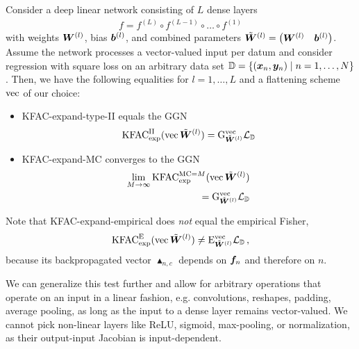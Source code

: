 \begin{test}
  Consider a deep linear network consisting of $L$ dense layers
  \begin{align*}
    f = f^{(L)} \circ f^{(L-1)} \circ \ldots \circ f^{(1)}
  \end{align*}
  with weights $\mW^{(l)}$, bias $\vb^{(l)}$, and combined parameters $\tilde{\mW}^{(l)} = \begin{pmatrix} \mW^{(l)} & \vb^{(l)} \end{pmatrix}$.
  Assume the network processes a vector-valued input per datum and consider regression with square loss on an arbitrary data set $\sD = \{ (\vx_n, \vy_n) \mid n = 1, \dots, N \}$.
  Then, we have the following equalities for $l = 1, \dots, L$ and a flattening scheme $\vec$ of our choice:
  \begin{itemize}
  \item KFAC-expand-type-II equals the GGN
    \begin{align*}
      \kfac^{\text{II}}_{\text{exp}}(\vec \tilde{\mW}^{(l)})
      =
      \ggn^{\vec}_{\tilde{\mW}^{(l)}} \gL_{\sD}
    \end{align*}
  \item KFAC-expand-MC converges to the GGN
    \begin{align*}
      \lim_{M \to \infty} \kfac^{\text{MC}=M}_{\text{exp}}(\vec \tilde{\mW}^{(l)})
      \\=
      \ggn^{\vec}_{\tilde{\mW}^{(l)}} \gL_{\sD}
    \end{align*}

  \end{itemize}
  Note that KFAC-expand-empirical does \emph{not} equal the empirical Fisher,
  \begin{align*}
    \kfac_{\text{exp}}^{\text{E}}(\vec \tilde{\mW}^{(l)})
    \neq
    \ef^{\vec}_{\tilde{\mW}^{(l)}} \gL_{\sD}\,,
  \end{align*}
  because its backpropagated vector $\blacktriangle_{n,c}$ depends on $\vf_n$ and therefore on $n$.
\end{test}
We can generalize this test further and allow for arbitrary operations that operate on an input in a linear fashion, e.g. convolutions, reshapes, padding, average pooling, as long as the input to a dense layer remains vector-valued.
We cannot pick non-linear layers like ReLU, sigmoid, max-pooling, or normalization, as their output-input Jacobian is input-dependent.

